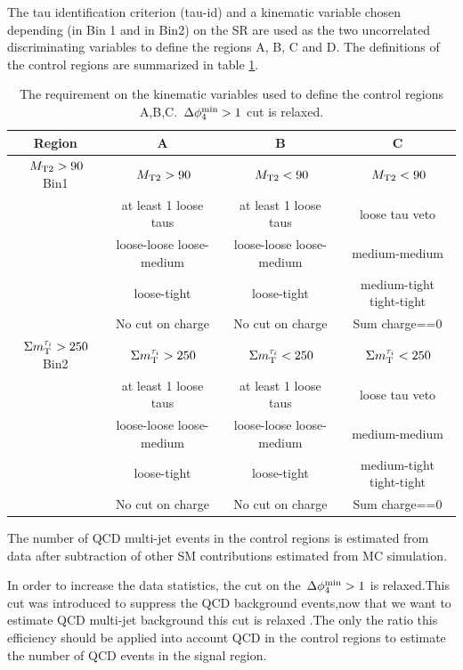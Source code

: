 The tau identification criterion (tau-id) and a kinematic variable chosen depending (\mttwo in Bin 1 and \SumMT in Bin2) 
on the SR are used as the two uncorrelated discriminating variables to define the regions A, B, C and D. The definitions of the control regions are summarized in table \ref{2QCDbg}.

\begin{table}
\begin{center}
\begin{tabular}{|c|c|c|c|}
\hline
Region&A& B & C
\\ \hline\hline
$\,{M_{\rm T2}}>90$ Bin1 &$\,{M_{\rm T2}} >90$ & $\,{M_{\rm T2}} <90$&$\,{M_{\rm T2}} <90$ \\
 &at least 1 loose taus&at least 1 loose taus& loose tau veto\\
 &loose-loose loose-medium &loose-loose loose-medium &medium-medium \\
 &loose-tight&loose-tight&medium-tight tight-tight\\ 
 &No cut on charge&No cut on charge& Sum charge==0\\
\hline
$\,\Sigma m_{\rm T}^{\tau_i}>250$ Bin2 &$\,\Sigma m_{\rm T}^{\tau_i} >250$ &$\,\Sigma m_{\rm T}^{\tau_i} <250$&$\,\Sigma m_{\rm T}^{\tau_i} < 250$\\
 &at least 1 loose taus&at least 1 loose taus& loose tau veto\\
 &loose-loose loose-medium &loose-loose loose-medium &medium-medium \\
 &loose-tight&loose-tight&medium-tight tight-tight\\
 &No cut on charge&No cut on charge& Sum charge==0\\

\hline
\end{tabular}
\caption{The requirement on the kinematic variables used to define the control regions A,B,C.
$\,{\Delta\phi_{4}^{\rm min}}>1$ cut is relaxed. }
\label{2QCDbg}
\end{center}
\end{table}

The number of QCD multi-jet events in the control regions is estimated from data after subtraction of other SM contributions estimated from MC simulation.

In order to increase the data statistics, the cut on the $\,{\Delta\phi_{4}^{\rm min}}>1$ is relaxed.This cut was
introduced to suppress the QCD background events,now that we want to estimate QCD multi-jet background this cut is relaxed  .The only the ratio this efficiency should be
applied into account QCD in the control regions to estimate the number of QCD events in the signal region.

